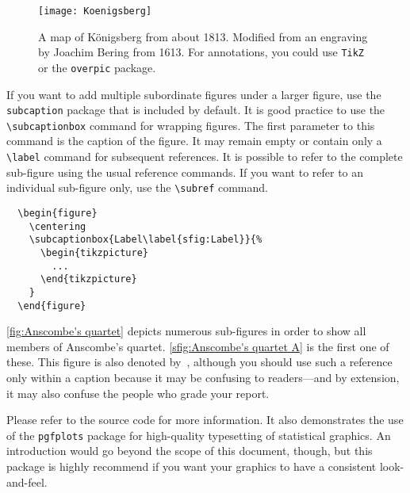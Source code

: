 \begin{figure}[t]
  \centering
  \texttt{[image: Koenigsberg]}
  \caption{%
    A map of Königsberg from about 1813. Modified from an engraving by
    Joachim Bering from 1613. For annotations, you could use
    \texttt{TikZ} or the \texttt{overpic} package.
  }
  \label{fig:Koenigsberg}
\end{figure}

If you want to add multiple subordinate figures under a larger figure,
use the \verb|subcaption| package that is included by default. It is
good practice to use the \verb|\subcaptionbox| command for wrapping
figures. The first parameter to this command is the caption of the
figure. It may remain empty or contain only a \verb|\label| command for
subsequent references. It is possible to refer to the complete
sub-figure using the usual reference commands. If you want to refer to
an individual sub-figure only, use the \verb|\subref| command.
%
\begin{verbatim}
  \begin{figure}
    \centering
    \subcaptionbox{Label\label{sfig:Label}}{%
      \begin{tikzpicture}
        ...
      \end{tikzpicture}
    }
  \end{figure}
\end{verbatim}
%
\autoref{fig:Anscombe's quartet} depicts numerous sub-figures in order
to show all members of Anscombe's quartet. \autoref{sfig:Anscombe's
quartet A} is the first one of these. This figure is also denoted
by~, although you should use such
a reference only within a caption because it may be confusing to
readers---and by extension, it may also confuse the people who grade
your report.

Please refer to the source code for more information. It also
demonstrates the use of the \verb|pgfplots| package for high-quality
typesetting of statistical graphics. An introduction would go beyond the
scope of this document, though, but this package is highly recommend if
you want your graphics to have a consistent look-and-feel. 

